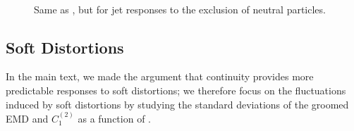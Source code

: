 \begin{figure}[p]
{    }
    \\
\caption{
    Same as , but for jet responses to the exclusion of neutral particles.
}
\label{fig:avcfrenzy}
\end{figure}

\subsection{Soft Distortions}
In the main text, we made the argument that continuity provides more predictable responses to soft distortions;
%
we therefore focus on the fluctuations induced by soft distortions by studying the standard deviations of the groomed EMD and \(C_1^{(2)}\) as a function of \zcut.


